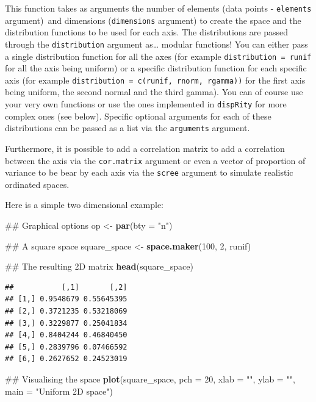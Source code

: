 \documentclass[]{book}
\newenvironment{Shaded}{\begin{snugshade}}{\end{snugshade}}
\newcommand{\KeywordTok}[1]{\textcolor[rgb]{0.13,0.29,0.53}{\textbf{#1}}}
\newcommand{\DataTypeTok}[1]{\textcolor[rgb]{0.13,0.29,0.53}{#1}}
\newcommand{\DecValTok}[1]{\textcolor[rgb]{0.00,0.00,0.81}{#1}}
\newcommand{\StringTok}[1]{\textcolor[rgb]{0.31,0.60,0.02}{#1}}
\newcommand{\NormalTok}[1]{#1}
\theoremstyle{definition}
\theoremstyle{definition}
\theoremstyle{remark}
\begin{document}
This function takes as arguments the number of elements (data points -
\texttt{elements} argument)~and dimensions (\texttt{dimensions}
argument) to create the space and the distribution functions to be used
for each axis. The distributions are passed through the
\texttt{distribution} argument as\ldots{} modular functions! You can
either pass a single distribution function for all the axes (for example
\texttt{distribution\ =\ runif} for all the axis being uniform) or a
specific distribution function for each specific axis (for example
\texttt{distribution\ =\ c(runif,\ rnorm,\ rgamma))} for the first axis
being uniform, the second normal and the third gamma). You can of course
use your very own functions or use the ones implemented in
\texttt{dispRity} for more complex ones (see below). Specific optional
arguments for each of these distributions can be passed as a list via
the \texttt{arguments} argument.

Furthermore, it is possible to add a correlation matrix to add a
correlation between the axis via the \texttt{cor.matrix} argument or
even a vector of proportion of variance to be bear by each axis via the
\texttt{scree} argument to simulate realistic ordinated spaces.

Here is a simple two dimensional example:

\begin{Shaded}
\begin{Highlighting}[]
\NormalTok{## Graphical options}
\NormalTok{op <-}\StringTok{ }\KeywordTok{par}\NormalTok{(}\DataTypeTok{bty =} \StringTok{"n"}\NormalTok{)}

\NormalTok{## A square space}
\NormalTok{square_space <-}\StringTok{ }\KeywordTok{space.maker}\NormalTok{(}\DecValTok{100}\NormalTok{, }\DecValTok{2}\NormalTok{, runif)}

\NormalTok{## The resulting 2D matrix}
\KeywordTok{head}\NormalTok{(square_space)}
\end{Highlighting}
\end{Shaded}

\begin{verbatim}
##           [,1]       [,2]
## [1,] 0.9548679 0.55645395
## [2,] 0.3721235 0.53218069
## [3,] 0.3229877 0.25041834
## [4,] 0.8404244 0.46840450
## [5,] 0.2839796 0.07466592
## [6,] 0.2627652 0.24523019
\end{verbatim}

\begin{Shaded}
\begin{Highlighting}[]
\NormalTok{## Visualising the space}
\KeywordTok{plot}\NormalTok{(square_space, }\DataTypeTok{pch =} \DecValTok{20}\NormalTok{, }\DataTypeTok{xlab =} \StringTok{""}\NormalTok{, }\DataTypeTok{ylab =} \StringTok{""}\NormalTok{, }\DataTypeTok{main =} \StringTok{"Uniform 2D space"}\NormalTok{)}
\end{Highlighting}
\end{Shaded}
\end{document}
